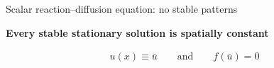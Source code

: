 \begin{frame}{Scalar reaction--diffusion equation: no stable patterns}
\begin{center}
\begin{minipage}{0.88\textwidth}
    \vspace{0.28cm}

    {\color{HydraCyan}\bfseries\fontsize{9.4}{12}\selectfont
      Every stable stationary solution is spatially constant
    \par}

    \vspace{-0.14cm}

    {\color{HydraWhite}\fontsize{10.4}{13.2}\selectfont
    \begin{align*}
      u(x)\equiv\bar u
      \qquad \text{and} \qquad
      f(\bar u)=0
    \end{align*}
    }

  \end{minipage}
\end{center}

\vfill


\end{frame}





